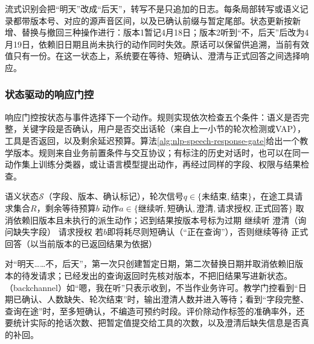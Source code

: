 流式识别会把“明天”改成“后天”，转写不是只追加的日志。每条局部转写或语义记录都带版本号、对应的源声音区间，以及已确认前缀与暂定尾部。状态更新按新增、替换与撤回三种操作进行：版本1暂记4月18日；版本2听到“不，后天”后改为4月19日，依赖旧日期且尚未执行的动作同时失效。原话可以保留供追溯，当前有效值只有一份。在这一状态上，系统要在等待、短确认、澄清与正式回答之间选择响应。

\subsubsection{状态驱动的响应门控}
\label{sec:nlp-speech-response-gate}

响应门控按状态与事件选择下一个动作。规则实现依次检查五个条件：语义是否完整，关键字段是否确认，用户是否交出话轮（来自上一小节的轮次检测或VAP），工具是否返回，以及剩余延迟预算。算法\ref{alg:nlp-speech-response-gate}给出一个教学版本。规则来自业务前置条件与交互协议；有标注的历史对话时，也可以在同一动作集上训练分类器，或让语言模型提出动作，再经过同样的字段、权限与结果检查。

\begin{algorithm}
  \label{alg:nlp-speech-response-gate}
  \begin{algorithmic}[1]
    \Require 语义状态$\mathcal S$（字段、版本、确认标记），轮次信号$q\in\{\text{未结束},\text{结束}\}$，在途工具请求集合$R$，剩余等待预算$b$
    \Ensure 动作$a\in\{\text{继续听},\text{短确认},\text{澄清},\text{请求授权},\text{正式回答}\}$
      \State 取消依赖旧版本且未执行的派生动作；迟到结果按版本号标为过期
    \EndIf
      \State \Return 继续听
    \EndIf
      \State \Return 澄清（询问缺失字段）
    \EndIf
      \State \Return 请求授权
    \EndIf
      \State \Return 若$b$即将耗尽则短确认（“正在查询”），否则继续等待
    \EndIf
    \State \Return 正式回答（以当前版本的已返回结果为依据）
  \end{algorithmic}
\end{algorithm}

对“明天……不，后天”，第一次只创建暂定日期，第二次替换日期并取消依赖旧版本的待发请求；已经发出的查询返回时先核对版本，不把旧结果写进新状态。（backchannel）如“嗯，我在听”只表示收到，不当作业务许可。教学门控看到“日期已确认、人数缺失、轮次结束”时，输出澄清人数并进入等待；看到“字段完整、查询在途”时，至多短确认，不编造可预约时段。评价除动作标签的准确率外，还要统计实际的抢话次数、把暂定值提交给工具的次数，以及澄清后缺失信息是否真的补回。

